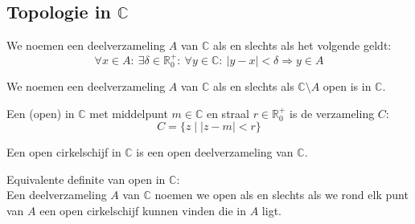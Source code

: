 \documentclass[main.tex]{subfiles}
\begin{document}
\subsection{Topologie in $\mathbb{C}$}
\label{sec:topologie-mathbbc}

\begin{de}
  We noemen een deelverzameling $A$ van $\mathbb{C}$  als en slechts als het volgende geldt:
  \[ \forall x\in A:\ \exists \delta \in \mathbb{R}_{0}^{+}:\ \forall y\in \mathbb{C}:\ |y-x| < \delta \Rightarrow y \in A \]
\end{de}

\begin{de}
  We noemen een deelverzameling $A$ van $\mathbb{C}$  als en slechts als $\mathbb{C} \setminus A$ open is in $\mathbb{C}$.
\end{de}

\begin{de}
  Een (open)  in $\mathbb{C}$ met middelpunt $m\in \mathbb{C}$ en straal $r\in \mathbb{R}_{0}^{+}$ is de verzameling $C$:
  \[ C = \{ z \mid |z-m| < r \} \]
\end{de}

\begin{st}
  Een open cirkelschijf in $\mathbb{C}$ is een open deelverzameling van $\mathbb{C}$.
\end{st}

\begin{st}
  Equivalente definite van open in $\mathbb{C}$:\\
  Een deelverzameling $A$ van $\mathbb{C}$ noemen we open als en slechts als we rond elk punt van $A$ een open cirkelschijf kunnen vinden die in $A$ ligt.
\end{st}




\end{document}
